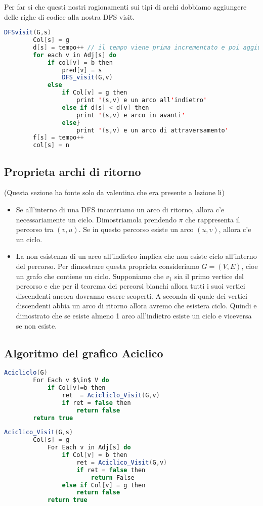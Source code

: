 Per far si che questi nostri ragionamenti sui tipi di archi dobbiamo aggiungere delle righe di codice alla nostra DFS visit.


\begin{lstlisting}[language=Java]
	DFSvisit(G,s)
		Col[s] = g
		d[s] = tempo++ // il tempo viene prima incrementato e poi aggiunto a d[s]
		for each v in Adj[s] do 
			if col[v] = b then
				pred[v] = s
				DFS_visit(G,v)
			else
				if Col[v] = g then
					print '(s,v) e un arco all'indietro'
				else if d[s] < d[v] then
					print '(s,v) e arco in avanti'
				else}
					print '(s,v) e un arco di attraversamento'
		f[s] = tempo++
		col[s] = n
\end{lstlisting}

\subsection{Proprieta archi di ritorno}
(Questa sezione ha fonte solo da valentina che era presente a lezione li)

\begin{itemize}
	\item Se all'interno di una DFS incontriamo un arco di ritorno, allora c'e necessariamente un ciclo.
		Dimostriamola prendendo $\pi$ che rappresenta il percorso tra $(v,u)$. Se in questo percorso esiste un arco $(u,v)$, allora c'e un ciclo.
	\item La non esistenza di un arco all'indietro implica che non esiste ciclo all'interno del percorso.
		Per dimostrare questa proprieta consideriamo $G = (V,E)$, cioe un grafo che contiene un ciclo. Supponiamo che $v_1$ sia il primo vertice del percorso e che per il teorema dei percorsi bianchi allora tutti i suoi vertici discendenti ancora dovranno essere scoperti. A seconda di quale dei vertici discendenti abbia un arco di ritorno allora avremo che esistera ciclo. Quindi e dimostrato che se esiste almeno 1 arco all'indietro esiste un ciclo e viceversa se non esiste.
\end{itemize}

\subsection{Algoritmo del grafico Aciclico}


\begin{lstlisting}[language=Java]
	Acicliclo(G)
		For Each v $\in$ V do
			if Col[v]=b then
				ret  = Acicliclo_Visit(G,v)
				if ret = false then
					return false
		return true
\end{lstlisting}


\begin{lstlisting}[language=Java]
	Aciclico_Visit(G,s)
		Col[s] = g
			For Each v in Adj[s] do 
				if Col[v] = b then
					ret = Aciclico_Visit(G,v)
					if ret = false then
						return False
				else if Col[v] = g then
					return false
			return true
\end{lstlisting}
